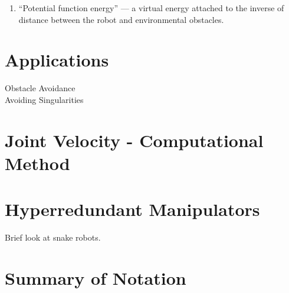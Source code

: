 \begin{enumerate}
\item ``Potential function energy'' ---  a virtual energy attached to the inverse
of distance between the robot and environmental obstacles.

\end{enumerate}


\section{Applications}
Obstacle Avoidance\\
Avoiding Singularities

\section{Joint Velocity - Computational Method}

\section{Hyperredundant Manipulators}
Brief look at snake robots.


\section{Summary of Notation}


